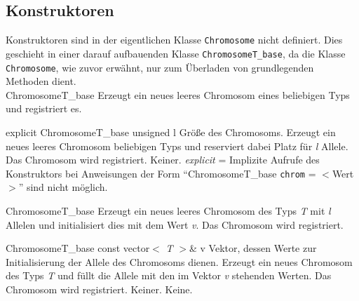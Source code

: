 \documentclass{report}
\begin{document}
\subsection{Konstruktoren}

Konstruktoren sind in der eigentlichen Klasse {\tt Chromosome} nicht
definiert. Dies geschieht in einer darauf aufbauenden Klasse 
{\tt ChromosomeT\_base}, da die Klasse {\tt Chromosome}, wie zuvor 
erw\"ahnt, nur zum \"Uberladen von grundlegenden Methoden dient.\\


\setNormalInstance
\printEmptyMethod
{ChromosomeT\_base}
{Erzeugt ein neues leeres Chromosom eines beliebigen Typs 
 und registriert es.}

\vspace{4ex}

\setNormalInstance
\printMethodWithOneParam
{explicit}
{ChromosomeT\_base}
{unsigned}
{l}
{Gr\"o{\ss}e des Chromosoms.}
{Erzeugt ein neues leeres Chromosom beliebigen Typs und 
 reserviert dabei Platz f\"ur {\em l} Allele. Das Chromosom wird registriert.}
{Keiner.}
{{\em explicit} = Implizite Aufrufe des Konstruktors bei Anweisungen der 
 Form ``ChromosomeT\_base {\tt chrom} = $<$Wert$>$'' sind nicht m\"oglich.}

\newpage

\setNormalInstance
\setCorrectWidthThree{8pt}
\printMethodWithParamsSaved
{}
{}
{ChromosomeT\_base}
{Erzeugt ein neues leeres Chromosom des Typs {\sl T} mit
    {\em l} Allelen und initialisiert dies mit dem Wert {\em v}. Das Chromosom wird
    registriert.}
{}
\setCorrectWidthThree{4pt}

\vspace{4ex}

\setNormalInstance
\printMethodWithOneParam
{}
{ChromosomeT\_base}
{const vector$<$ {\sl T} $>$\&}
{v}
{Vektor, dessen Werte zur Initialisierung der Allele 
                        des Chromosoms dienen.}
{Erzeugt ein neues Chromosom des Typs {\sl T} und f\"ullt die
    Allele mit den im Vektor {\em v} stehenden Werten. Das Chromosom wird
    registriert.}
{Keiner.}
{Keine.}
 
\end{document}
